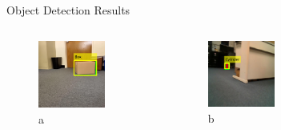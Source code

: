 \documentclass[10pt]{beamer}
\begin{document}
\begin{frame}{Object Detection Results}
\begin{columns}
     \begin{figure}
         \centering
         \includegraphics[width=0.75\textwidth]{Images/tt1.png}
         \caption{a}
     \end{figure}
     \vspace{-10pt}
     \begin{figure}
         \centering
         \includegraphics[width=0.75\textwidth]{Images/tt2.png}
         \caption{b}
     \end{figure}  
     \begin{figure}

\end{figure}
\end{columns}
\end{frame}
\end{document}
